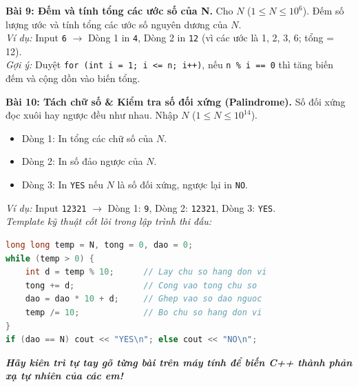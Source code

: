 \documentclass[11pt,a4paper]{article}
\begin{document}
\vspace{0.15cm}
\noindent
\textbf{\color{AsianBlue}Bài 9: Đếm và tính tổng các ước số của N.} Cho $N$ ($1 \le N \le 10^6$). Đếm số lượng ước và tính tổng các ước số nguyên dương của $N$.\\
\textit{Ví dụ:} Input \texttt{6} $\to$ Dòng 1 in \texttt{4}, Dòng 2 in \texttt{12} (vì các ước là 1, 2, 3, 6; tổng = 12).\\
\textit{Gợi ý:} Duyệt \texttt{for (int i = 1; i <= n; i++)}, nếu \texttt{n \% i == 0} thì tăng biến đếm và cộng dồn vào biến tổng.

\vspace{0.15cm}
\noindent
\textbf{\color{AsianBlue}Bài 10: Tách chữ số \& Kiểm tra số đối xứng (Palindrome).} Số đối xứng đọc xuôi hay ngược đều như nhau. Nhập $N$ ($1 \le N \le 10^{14}$).
\begin{itemize}
    \setlength{\itemsep}{0.5pt}
    \footnotesize
    \item Dòng 1: In tổng các chữ số của $N$.
    \item Dòng 2: In số đảo ngược của $N$.
    \item Dòng 3: In \texttt{YES} nếu $N$ là số đối xứng, ngược lại in \texttt{NO}.
\end{itemize}
\textit{Ví dụ:} Input \texttt{12321} $\to$ Dòng 1: \texttt{9}, Dòng 2: \texttt{12321}, Dòng 3: \texttt{YES}.\\
\textit{Template kỹ thuật cốt lõi trong lập trình thi đấu:}
\begin{lstlisting}[language=C++]
long long temp = N, tong = 0, dao = 0;
while (temp > 0) {
    int d = temp % 10;      // Lay chu so hang don vi
    tong += d;              // Cong vao tong chu so
    dao = dao * 10 + d;     // Ghep vao so dao nguoc
    temp /= 10;             // Bo chu so hang don vi
}
if (dao == N) cout << "YES\n"; else cout << "NO\n";
\end{lstlisting}

\vspace{0.25cm}
\begin{center}
    \textit{\color{AsianDarkBlue}\textbf{Hãy kiên trì tự tay gõ từng bài trên máy tính để biến C++ thành phản xạ tự nhiên của các em!}}
\end{center}
\end{document}
